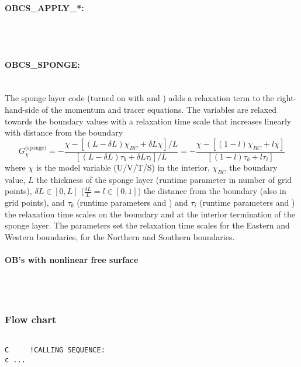 \paragraph{OBCS\_APPLY\_*:} ~ \\
~

\paragraph{OBCS\_SPONGE:} ~ \\
%
The sponge layer code (turned on with  and
) adds a relaxation term to the right-hand-side of
the momentum and tracer equations. The variables are relaxed towards
the boundary values with a relaxation time scale that increases
linearly with distance from the boundary
\[
G_{\chi}^{\mbox{(sponge)}} = 
- \frac{\chi - [( L - \delta{L} ) \chi_{BC} + \delta{L}\chi]/L}
{[(L-\delta{L})\tau_{b}+\delta{L}\tau_{i}]/L} 
= - \frac{\chi - [( 1 - l ) \chi_{BC} + l\chi]}
{[(1-l)\tau_{b}+l\tau_{i}]}
\]
where $\chi$ is the model variable (U/V/T/S) in the interior,
$\chi_{BC}$ the boundary value, $L$ the thickness of the sponge layer
(runtime parameter  in number of grid points),
$\delta{L}\in[0,L]$ ($\frac{\delta{L}}{L}=l\in[0,1]$) the distance from the boundary (also in grid points), and
$\tau_{b}$ (runtime parameters  and
) and $\tau_{i}$ (runtime parameters
 and ) the relaxation time
scales on the boundary and at the interior termination of the sponge
layer. The parameters  set the relaxation
time scales for the Eastern and Western boundaries,
 for the Northern and Southern boundaries.

\paragraph{OB's with nonlinear free surface} ~ \\
%
~



\subsubsection{Flow chart
\label{sec:pkg:obcs:flowchart}}


{\footnotesize
\begin{verbatim}

C     !CALLING SEQUENCE:
c ...

\end{verbatim}
}

